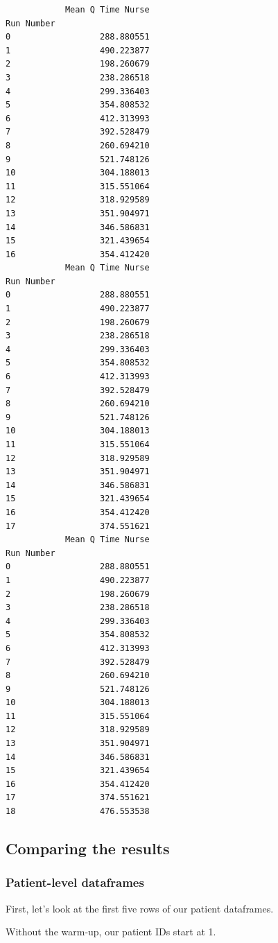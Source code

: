 \documentclass[
  letterpaper,
  DIV=11,
  numbers=noendperiod]{scrreprt}
\begin{document}
\begin{verbatim}
            Mean Q Time Nurse
Run Number                   
0                  288.880551
1                  490.223877
2                  198.260679
3                  238.286518
4                  299.336403
5                  354.808532
6                  412.313993
7                  392.528479
8                  260.694210
9                  521.748126
10                 304.188013
11                 315.551064
12                 318.929589
13                 351.904971
14                 346.586831
15                 321.439654
16                 354.412420
            Mean Q Time Nurse
Run Number                   
0                  288.880551
1                  490.223877
2                  198.260679
3                  238.286518
4                  299.336403
5                  354.808532
6                  412.313993
7                  392.528479
8                  260.694210
9                  521.748126
10                 304.188013
11                 315.551064
12                 318.929589
13                 351.904971
14                 346.586831
15                 321.439654
16                 354.412420
17                 374.551621
            Mean Q Time Nurse
Run Number                   
0                  288.880551
1                  490.223877
2                  198.260679
3                  238.286518
4                  299.336403
5                  354.808532
6                  412.313993
7                  392.528479
8                  260.694210
9                  521.748126
10                 304.188013
11                 315.551064
12                 318.929589
13                 351.904971
14                 346.586831
15                 321.439654
16                 354.412420
17                 374.551621
18                 476.553538
\end{verbatim}

\subsection{Comparing the results}\label{comparing-the-results}

\subsubsection{Patient-level dataframes}\label{patient-level-dataframes}

First, let's look at the first five rows of our patient dataframes.

Without the warm-up, our patient IDs start at 1.
\end{document}

